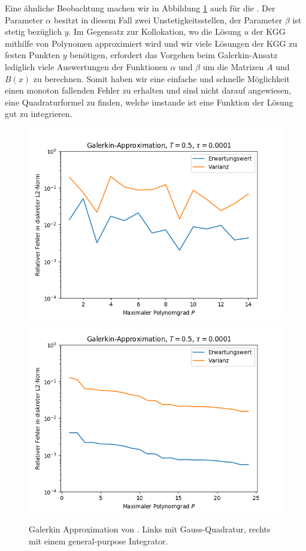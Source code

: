 \newline
Eine ähnliche Beobachtung machen wir in Abbildung \ref{fig:galerkin_bydegree_trialtriple} auch für die . Der Parameter $\alpha$ besitzt in diesem Fall zwei Unstetigkeitsstellen, der Parameter $\beta$ ist stetig bezüglich $y$. Im Gegensatz zur Kollokation, wo die Lösung $u$ der KGG mithilfe von Polynomen approximiert wird und wir viele Lösungen der KGG zu festen Punkten $y$ benötigen, erfordert das Vorgehen beim Galerkin-Ansatz lediglich viele Auswertungen der Funktionen $\alpha$ und $\beta$ um die Matrizen $A$ und $B(x)$ zu berechnen. Somit haben wir eine einfache und schnelle Möglichkeit einen monoton fallenden Fehler zu erhalten und sind nicht darauf angewiesen, eine Quadraturformel zu finden, welche imstande ist eine Funktion der Lösung gut zu integrieren.
 \begin{figure}[!htb]
  \includegraphics[width=\linewidth]{Figures/galerkin_bydegree_trialdisconttriple_gauss.png}
\endminipage
{}
  \includegraphics[width=\linewidth]{Figures/galerkin_bydegree_trialdisconttriple_genpurp.png}
\endminipage
  \caption{Galerkin Approximation von . Links mit Gauss-Quadratur, rechts mit einem general-purpose Integrator.}
  \label{fig:galerkin_bydegree_trialtriple}
\end{figure}
